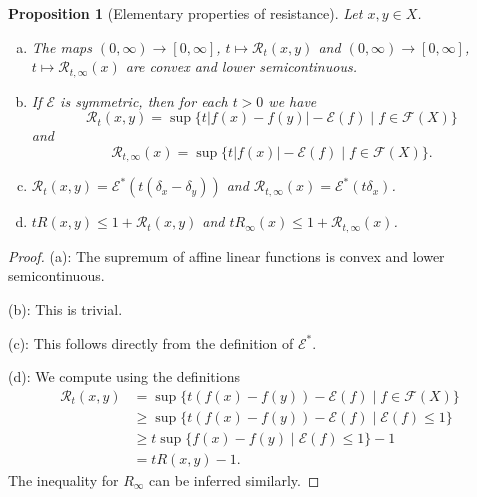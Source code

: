 \documentclass[a4paper,11pt,reqno]{amsart}
\newtheorem{proposition}[lemma]{Proposition}
\theoremstyle{definition}
\numberwithin{equation}{section}
\newcommand{\cR}{{\mathcal R}}
\newcommand{\cE}{{\mathcal E}}
\newcommand{\cF}{{\mathcal F}}
\newcommand{\av}[1]{\left\Vert #1\right\Vert}
\newcommand{\1}{\mathds{1}}
\begin{document}
\begin{proposition}[Elementary properties of resistance] \label{prop:elementary properties resistance}
Let $x,y \in X$. 
\begin{enumerate}[(a)]
 \item The maps $(0,\infty) \to [0,\infty]$, $t \mapsto \cR_t(x,y)$ and $(0,\infty) \to [0,\infty]$, $t \mapsto \cR_{t,\infty}(x)$  are convex and lower semicontinuous.
 \item If $\cE$ is symmetric, then for each $t > 0$ we have 
 $$\cR_t(x,y) = \sup \{ t |f(x) - f(y)| - \cE(f) \mid f \in \cF(X)\}$$
 and 
 $$ \cR_{t,\infty}(x) = \sup \{ t |f(x)|  - \cE(f) \mid f \in \cF(X)\}.$$
 
 
 \item $\cR_t(x,y) = \cE^*(t (\delta_{x} - \delta_{y}))$ and $\cR_{t,\infty}(x) = \cE^*(t \delta_x)$.
 
 \item $t R(x,y) \leq 1 + \cR_t(x,y)$ and $t R_{\infty}(x) \leq 1 + \cR_{t,\infty}(x)$.
\end{enumerate}
\end{proposition}
\begin{proof}
(a): The supremum of affine linear functions is convex and lower semicontinuous. 

(b): This is trivial. 

(c): This follows directly from the definition of $\cE^*$.

(d): We compute using the definitions
%
\begin{align*}
    \cR_t(x,y) &=    \sup \{t (f(x) - f(y)) - \cE(f) \mid f \in \cF(X)\}\\
    &\geq \sup \{t (f(x) - f(y)) - \cE(f) \mid \cE(f) \leq 1\}\\
    &\geq  t\sup \{ f(x) - f(y) \mid \cE(f) \leq 1\} - 1\\
    &= t R(x,y) - 1.
    \end{align*}
%
The inequality for $R_\infty$ can be inferred similarly. 
\end{proof}
\end{document}
